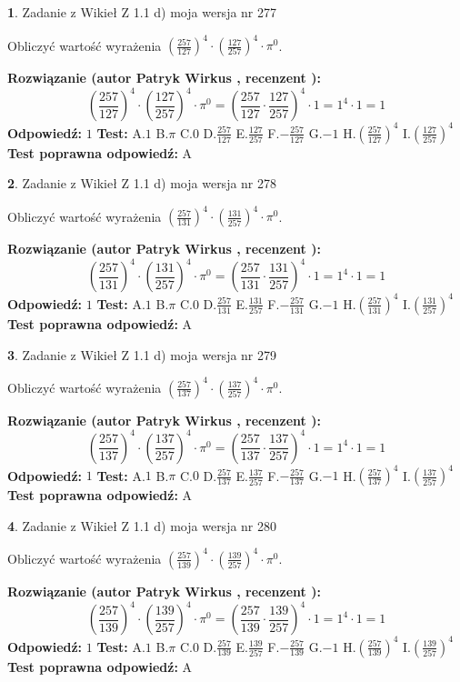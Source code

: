\documentclass[12pt, a4paper]{article}
\theoremstyle{definition} %
\newtheorem{zad}{}
\newcommand{\zadStart}[1]{\begin{zad}#1\newline}
\newcommand{\zadStop}{\end{zad}}
\newcommand{\rozwStart}[2]{\noindent \textbf{Rozwiązanie (autor #1 , recenzent #2): }\newline}
\newcommand{\rozwStop}{\newline}
\newcommand{\odpStart}{\noindent \textbf{Odpowiedź:}\newline}
\newcommand{\odpStop}{\newline}
\newcommand{\testStart}{\noindent \textbf{Test:}\newline}
\newcommand{\testStop}{\newline}
\newcommand{\kluczStart}{\noindent \textbf{Test poprawna odpowiedź:}\newline}
\newcommand{\kluczStop}{\newline}
\begin{document}
\zadStart{Zadanie z Wikieł Z 1.1 d) moja wersja nr 277}

Obliczyć wartość wyrażenia $(\frac{257}{127})^{4} \cdot (\frac{127}{257})^{4} \cdot \pi^{0}$.
\zadStop
\rozwStart{Patryk Wirkus}{}
$$(\frac{257}{127})^{4} \cdot (\frac{127}{257})^{4} \cdot \pi^{0} = (\frac{257}{127} \cdot \frac{127}{257})^{4} \cdot 1 = 1^{4} \cdot 1 = 1$$
\rozwStop
\odpStart
$1$
\odpStop
\testStart
A.$1$ B.$\pi$ C.$0$ D.$\frac{257}{127}$ E.$\frac{127}{257}$
F.$-\frac{257}{127}$ G.$-1$
H.$(\frac{257}{127})^{4}$
I.$(\frac{127}{257})^{4}$
\testStop
\kluczStart
A
\kluczStop



\zadStart{Zadanie z Wikieł Z 1.1 d) moja wersja nr 278}

Obliczyć wartość wyrażenia $(\frac{257}{131})^{4} \cdot (\frac{131}{257})^{4} \cdot \pi^{0}$.
\zadStop
\rozwStart{Patryk Wirkus}{}
$$(\frac{257}{131})^{4} \cdot (\frac{131}{257})^{4} \cdot \pi^{0} = (\frac{257}{131} \cdot \frac{131}{257})^{4} \cdot 1 = 1^{4} \cdot 1 = 1$$
\rozwStop
\odpStart
$1$
\odpStop
\testStart
A.$1$ B.$\pi$ C.$0$ D.$\frac{257}{131}$ E.$\frac{131}{257}$
F.$-\frac{257}{131}$ G.$-1$
H.$(\frac{257}{131})^{4}$
I.$(\frac{131}{257})^{4}$
\testStop
\kluczStart
A
\kluczStop



\zadStart{Zadanie z Wikieł Z 1.1 d) moja wersja nr 279}

Obliczyć wartość wyrażenia $(\frac{257}{137})^{4} \cdot (\frac{137}{257})^{4} \cdot \pi^{0}$.
\zadStop
\rozwStart{Patryk Wirkus}{}
$$(\frac{257}{137})^{4} \cdot (\frac{137}{257})^{4} \cdot \pi^{0} = (\frac{257}{137} \cdot \frac{137}{257})^{4} \cdot 1 = 1^{4} \cdot 1 = 1$$
\rozwStop
\odpStart
$1$
\odpStop
\testStart
A.$1$ B.$\pi$ C.$0$ D.$\frac{257}{137}$ E.$\frac{137}{257}$
F.$-\frac{257}{137}$ G.$-1$
H.$(\frac{257}{137})^{4}$
I.$(\frac{137}{257})^{4}$
\testStop
\kluczStart
A
\kluczStop



\zadStart{Zadanie z Wikieł Z 1.1 d) moja wersja nr 280}

Obliczyć wartość wyrażenia $(\frac{257}{139})^{4} \cdot (\frac{139}{257})^{4} \cdot \pi^{0}$.
\zadStop
\rozwStart{Patryk Wirkus}{}
$$(\frac{257}{139})^{4} \cdot (\frac{139}{257})^{4} \cdot \pi^{0} = (\frac{257}{139} \cdot \frac{139}{257})^{4} \cdot 1 = 1^{4} \cdot 1 = 1$$
\rozwStop
\odpStart
$1$
\odpStop
\testStart
A.$1$ B.$\pi$ C.$0$ D.$\frac{257}{139}$ E.$\frac{139}{257}$
F.$-\frac{257}{139}$ G.$-1$
H.$(\frac{257}{139})^{4}$
I.$(\frac{139}{257})^{4}$
\testStop
\kluczStart
A
\kluczStop
\end{document}

